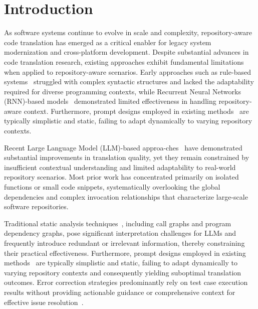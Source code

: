 \section{Introduction}

As software systems continue to evolve in scale and complexity, repository-aware code translation has emerged as a critical enabler for legacy system modernization and cross-platform development. Despite substantial advances in code translation research, existing approaches exhibit fundamental limitations when applied to repository-aware scenarios. Early approaches such as rule-based systems~\cite{nguyen2013lexical,chen2018tree} struggled with complex syntactic structures and lacked the adaptability required for diverse programming contexts, while Recurrent Neural Networks (RNN)-based models~\cite{dong2016language,yin2017syntactic,yin2018tranx} demonstrated limited effectiveness in handling repository-aware context. Furthermore, prompt designs employed in existing methods~\cite{khan2024xcodeeval,macedo2024exploring,pan2024lost,yang2024exploring} are typically simplistic and static, failing to adapt dynamically to varying repository contexts.

Recent Large Language Model (LLM)-based approa-ches~\cite{lano2024using,nitin2024spectra,pan2308understanding,yin2024rectifier} have demonstrated substantial improvements in translation quality, yet they remain constrained by insufficient contextual understanding and limited adaptability to real-world repository scenarios. Most prior work has concentrated primarily on isolated functions or small code snippets, systematically overlooking the global dependencies and complex invocation relationships that characterize large-scale software repositories.

Traditional static analysis techniques~\cite{ou2024repository,wang2024repotransbench}, including call graphs and program dependency graphs, pose significant interpretation challenges for LLMs and frequently introduce redundant or irrelevant information, thereby constraining their practical effectiveness. Furthermore, prompt designs employed in existing methods~\cite{khan2024xcodeeval,macedo2024exploring,pan2024lost,yang2024exploring} are typically simplistic and static, failing to adapt dynamically to varying repository contexts and consequently yielding suboptimal translation outcomes. Error correction strategies predominantly rely on test case execution results without providing actionable guidance or comprehensive context for effective issue resolution~\cite{pan2024lost,yang2024exploring}.

